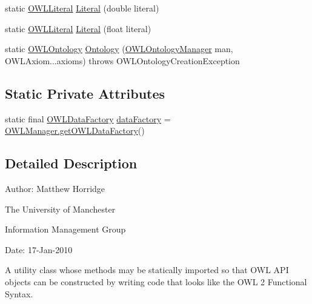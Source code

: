 \begin{DoxyCompactItemize}
\item 
static \hyperlink{interfaceorg_1_1semanticweb_1_1owlapi_1_1model_1_1_o_w_l_literal}{O\-W\-L\-Literal} \hyperlink{classorg_1_1semanticweb_1_1owlapi_1_1apibinding_1_1_o_w_l_functional_syntax_factory_a2098e44755bdf70584993f3cf5f19066}{Literal} (double literal)
\item 
static \hyperlink{interfaceorg_1_1semanticweb_1_1owlapi_1_1model_1_1_o_w_l_literal}{O\-W\-L\-Literal} \hyperlink{classorg_1_1semanticweb_1_1owlapi_1_1apibinding_1_1_o_w_l_functional_syntax_factory_abf0ddd793f2060f335fabb84390c3919}{Literal} (float literal)
\item 
static \hyperlink{interfaceorg_1_1semanticweb_1_1owlapi_1_1model_1_1_o_w_l_ontology}{O\-W\-L\-Ontology} \hyperlink{classorg_1_1semanticweb_1_1owlapi_1_1apibinding_1_1_o_w_l_functional_syntax_factory_a8d6f1f068d3f740804e88df60b1d5d2f}{Ontology} (\hyperlink{interfaceorg_1_1semanticweb_1_1owlapi_1_1model_1_1_o_w_l_ontology_manager}{O\-W\-L\-Ontology\-Manager} man, O\-W\-L\-Axiom...\-axioms)  throws O\-W\-L\-Ontology\-Creation\-Exception 
\end{DoxyCompactItemize}
\subsection*{Static Private Attributes}
\begin{DoxyCompactItemize}
\item 
static final \hyperlink{interfaceorg_1_1semanticweb_1_1owlapi_1_1model_1_1_o_w_l_data_factory}{O\-W\-L\-Data\-Factory} \hyperlink{classorg_1_1semanticweb_1_1owlapi_1_1apibinding_1_1_o_w_l_functional_syntax_factory_acd20e192310039e89c8dccf724987ff2}{data\-Factory} = \hyperlink{classorg_1_1semanticweb_1_1owlapi_1_1apibinding_1_1_o_w_l_manager_aa1c4536a1e6ec54da82c88dc0e58e962}{O\-W\-L\-Manager.\-get\-O\-W\-L\-Data\-Factory}()
\end{DoxyCompactItemize}


\subsection{Detailed Description}
Author\-: Matthew Horridge\par
 The University of Manchester\par
 Information Management Group\par
 Date\-: 17-\/\-Jan-\/2010 

A utility class whose methods may be statically imported so that O\-W\-L A\-P\-I objects can be constructed by writing code that looks like the O\-W\-L 2 Functional Syntax. 

